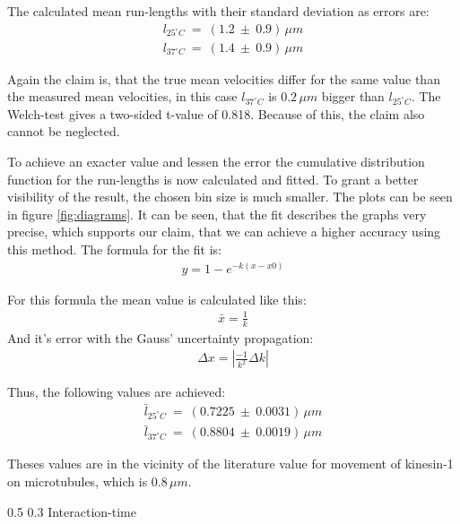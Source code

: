 \documentclass[english, %
parskip=full, %
bibliography=totoc, %
]{scrartcl}
\makeatletter
\renewcommand\subsection{\@startsection 
   {subsection}{2}{0mm}%
   {0.5\baselineskip}%
   {0.3\baselineskip}%
   {\bfseries\sffamily\large}%
   }
\makeatother
\begin{document}
The calculated mean run-lengths with their standard deviation as errors are:
\begin{align*}
l _{25^\circ C} \ = \ (1.2 \ \pm \ 0.9) \, \mu m \\
l _{37^\circ C} \ = \ (1.4 \ \pm \ 0.9) \, \mu m
\end{align*}

Again the claim is, that the true mean velocities differ for the same value than the measured mean velocities, in this case $l _{37^\circ C}$ is \(0.2\, \mu m\) bigger than $l _{25^\circ C}$. The Welch-test gives a two-sided t-value of 0.818. Because of this, the claim also cannot be neglected. 

To achieve an exacter value and lessen the error the cumulative distribution function for the run-lengths is now calculated and fitted. To grant a better visibility of the result, the chosen bin size is much smaller. The plots can be seen in figure \ref{fig:diagrams}. It can be seen, that the fit describes the graphs very precise, which supports our claim, that we can achieve a higher accuracy using this method. The formula for the fit is:
\begin{align*}
y = 1 - e^{-k(x - x0)}
\end{align*}

For this formula the mean value is calculated like this\cite{mean_cdf}:
\begin{align*}
\bar{x} = \frac{1}{k}
\end{align*}
And it's error with the Gauss' uncertainty propagation:
\begin{align*}
\Delta x = |\frac{-1}{k^2} \Delta k|
\end{align*}

Thus, the following values are achieved:
\begin{align*}
\bar{l} _{25^\circ C} \ = \ (0.7225 \ \pm \ 0.0031) \, \mu m \\
\bar{l} _{37^\circ C} \ = \ (0.8804 \ \pm \ 0.0019) \, \mu m
\end{align*}

Theses values are in the vicinity of the literature value for movement of kinesin-1 on microtubules, which is 0.8\,$\mu m$. 

\subsection{Interaction-time}
\end{document}
